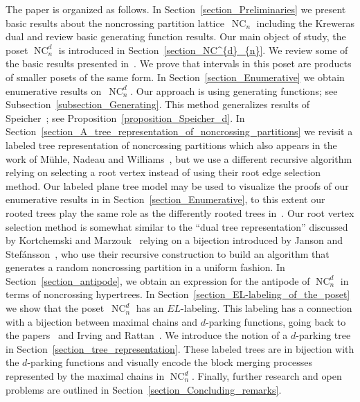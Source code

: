 \documentclass[11pt]{amsart}
\numberwithin{equation}{section}
\DeclareMathOperator{\NC}{NC}
\begin{document}
The paper is organized as follows.
In Section~\ref{section_Preliminaries}
we present basic results about the noncrossing partition lattice~$\NC_{n}$
including the Kreweras dual and review basic generating function results.
Our main object of study, the poset $\NC^{d}_{n}$ is
introduced in Section~\ref{section_NC^{d}_{n}}. We review some of
the basic results presented in~\cite{Muhle_Nadeau_Williams}. We prove
that intervals in this poset are products of 
smaller posets of the same form.
In Section~\ref{section_Enumerative}
we obtain enumerative results on~$\NC^{d}_{n}$.
Our approach is using generating functions; 
see Subsection~\ref{subsection_Generating}.
This method generalizes results of Speicher~\cite{Speicher}; 
see Proposition~\ref{proposition_Speicher_d}.
In Section~\ref{section_A_tree_representation_of_noncrossing_partitions}
we revisit a labeled tree representation of noncrossing partitions which
also appears in the work of M\"uhle, Nadeau and
Williams~\cite{Muhle_Nadeau_Williams}, but we use a different recursive
algorithm relying on selecting a root vertex instead of using their root
edge selection method. Our labeled plane tree model
may be used to visualize the proofs of our enumerative results in in
Section~\ref{section_Enumerative}, to this extent our rooted trees play
the same role as the differently rooted trees
in~\cite{Muhle_Nadeau_Williams}. Our root vertex selection method is 
somewhat similar to the ``dual tree representation''
discussed by Kortchemski and Marzouk~\cite[Section 2]{Kortchemski_Marzouk}
relying on a bijection introduced by Janson and
Stef\'ansson~\cite{Janson_Stefansson}, who use their recursive
construction to build an algorithm that generates a random noncrossing
partition in a uniform fashion.  
In Section~\ref{section_antipode}, 
we obtain an expression for the antipode of $\NC^{d}_{n}$
in terms of noncrossing hypertrees.
In Section~\ref{section_EL-labeling_of_the_poset}
we show that the poset~$\NC^{d}_{n}$
has an $EL$-labeling.
This labeling has a connection with a bijection
between maximal chains and
$d$-parking functions,
going back to the papers~\cite{Muhle_Nadeau_Williams}
and Irving and Rattan~\cite{Irving_Rattan}.
We introduce the notion of a $d$-parking tree in
Section~\ref{section_tree_representation}. These labeled trees are in bijection
with the $d$-parking functions and visually encode the block merging
processes represented by the maximal chains in $\NC^{d}_{n}$.
Finally, further research and open problems are
outlined in Section~\ref{section_Concluding_remarks}.
\end{document}
